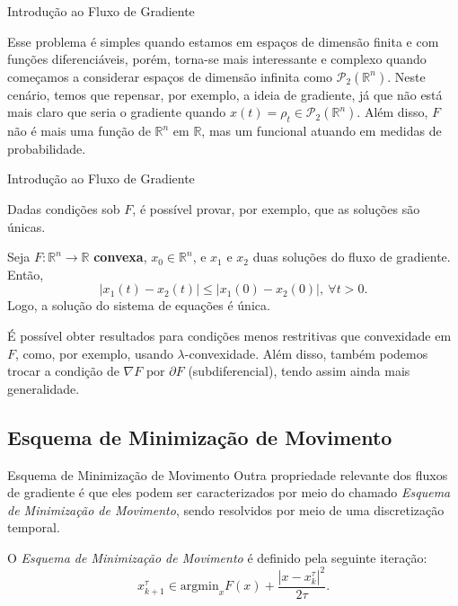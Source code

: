 \documentclass[10pt]{beamer}
\begin{document}
\begin{frame}[fragile]{Introdução ao Fluxo de Gradiente}

	Esse problema é simples quando estamos em espaços de dimensão finita e com
	funções diferenciáveis, porém, torna-se mais
	interessante e complexo quando começamos a considerar espaços de dimensão infinita
	como $\mathcal P_2(\mathbb R^n)$. Neste cenário, temos que repensar, por exemplo,
	a ideia de gradiente, já que não está mais claro que seria o gradiente quando
	$x(t) = \rho_t \in \mathcal P_2(\mathbb R^n)$. Além disso, $F$ não é mais uma
	função de $\mathbb R^n$ em $\mathbb R$, mas um funcional atuando em medidas
	de probabilidade.

\end{frame}

\begin{frame}[fragile]{Introdução ao Fluxo de Gradiente}

	Dadas condições sob $F$, é possível provar, por exemplo, que
	as soluções são únicas.
	\begin{theorem}
    Seja $F:\mathbb R^n \to \mathbb R$ \textbf{convexa}, $x_0 \in \mathbb R^n$, e
    $x_1$ e $x_2$ duas soluções do fluxo de gradiente.
    Então,
    \begin{equation}
        |x_1(t) - x_2(t)| \leq |x_1(0) - x_2(0)|, \ \forall t >0.
    \end{equation}
    Logo, a solução do sistema de equações é única.
\end{theorem}

É possível obter resultados para condições menos restritivas que convexidade
em $F$, como, por exemplo, usando $\lambda$-convexidade.
Além disso, também podemos trocar a condição de $\nabla F$ por $\partial F$ (subdiferencial),
tendo assim ainda mais generalidade.

\vspace{3mm}

\end{frame}

\subsection{Esquema de Minimização de Movimento}
\begin{frame}[fragile]{Esquema de Minimização de Movimento}
Outra propriedade relevante dos fluxos de gradiente é que eles podem ser
caracterizados por meio do chamado \textit{Esquema de Minimização de Movimento},
sendo resolvidos por meio de uma discretização temporal.

\vspace{3mm}

O \textit{Esquema de Minimização de Movimento} é definido pela seguinte iteração:
\begin{equation}
    x_{k+1}^\tau \in \text{argmin}_{x} F(x)+\frac{|x - x_k^\tau|^2}{2\tau}.
    \label{EMM}
\end{equation}
\end{frame}
\end{document}
